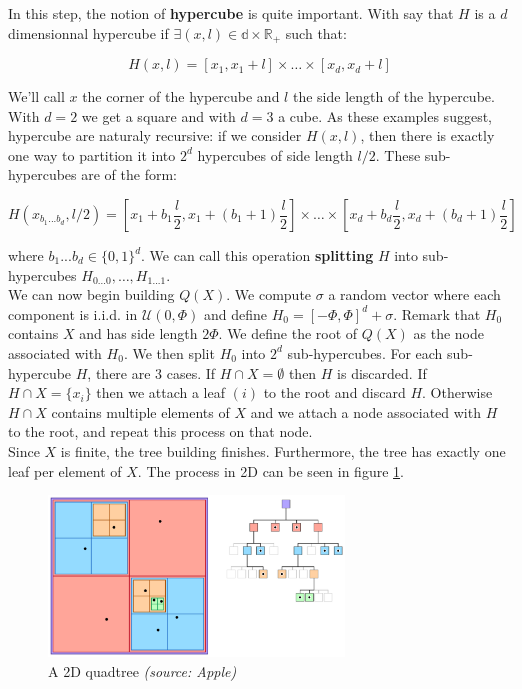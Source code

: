 \documentclass{article}
\begin{document}
In this step, the notion of \textbf{hypercube} is quite important. With say that $H$ is a $d$ dimensionnal hypercube if $\exists (x, l) \in \mathbb{d} \times \mathbb{R}_+$ such that:

$$
H(x, l) = [x_1, x_1 + l] \times \dots \times [x_d, x_d + l]
$$

We'll call $x$ the corner of the hypercube and $l$ the side length of the hypercube. With $d=2$ we get a square and with $d=3$ a cube. As these examples suggest, hypercube are naturaly recursive: if we consider $H(x, l)$, then there is exactly one way to partition it into $2^d$ hypercubes of side length $l/2$. These sub-hypercubes are of the form:

$$
H(x_{b_1...b_d}, l/2) = [x_1 + b_1 \frac{l}{2}, x_1 + (b_1+1) \frac{l}{2}] \times \dots \times [x_d + b_d \frac{l}{2}, x_d + (b_d+1) \frac{l}{2}]
$$

where $b_1...b_d \in \{ 0, 1 \}^d$. We can call this operation \textbf{splitting} $H$ into sub-hypercubes $H_{0...0}, \dots, H_{1...1}$.\\

We can now begin building $Q(X)$. We compute $\sigma$ a random vector where each component is i.i.d. in $\mathcal{U}(0, \Phi)$ and define $H_0 = [-\Phi, \Phi]^d + \sigma$. Remark that $H_0$ contains $X$ and has side length $2\Phi$. We define the root of $Q(X)$ as the node associated with $H_0$. We then split $H_0$ into $2^d$ sub-hypercubes. For each sub-hypercube $H$, there are 3 cases. If $H \cap X = \emptyset$ then $H$ is discarded. If $H \cap X = \{x_i\}$ then we attach a leaf $(i)$ to the root and discard $H$. Otherwise $H \cap X$ contains multiple elements of $X$ and we attach a node associated with $H$ to the root, and repeat this process on that node.\\
Since $X$ is finite, the tree building finishes. Furthermore, the tree has exactly one leaf per element of $X$. The process in 2D can be seen in figure \ref{quadtree}.

\begin{figure}[h]
\centering
\includegraphics[width=0.7\textwidth]{imgs/quadtree.png}
\caption{A 2D quadtree \textit{(source: Apple)}}
\label{quadtree}
\end{figure}
\end{document}
